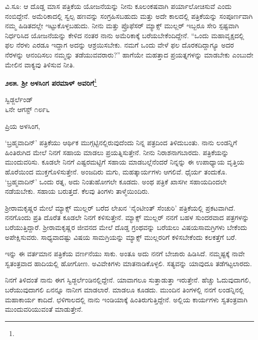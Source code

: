 \vspace{-0.1cm}

ವಿ.ಸೂ:\enginline{-} ಆ ದೊಡ್ಡ ಮಾಸ ಪತ್ರಿಕೆಯ ಯೋಜನೆಯನ್ನು ನೀನು ಕೂಲಂಕಷವಾಗಿ ಪರ್ಯಾಲೋಚಿಸುವೆ ಎಂದು ನಂಬಿದ್ದೇನೆ. ಅಮೆರಿಕಾದಲ್ಲಿ ಸ್ವಲ್ಪ ಹಣವನ್ನು ಸಂಗ್ರಹಿಸ\break ಬಹುದು ಮತ್ತು ಅದೇ ಕಾಲದಲ್ಲಿ ಪತ್ರಿಕೆಯನ್ನು ಸಂಪೂರ್ಣವಾಗಿ ನಮ್ಮ ಹಿಡಿತದಲ್ಲೇ ಇಟ್ಟುಕೊಳ್ಳಬಹುದು. ನೀನು ಮತ್ತು ಪ್ರೊಫೆಸರ್‌ ಮ್ಯಾಕ್ಸ್ ಮುಲ್ಲರ್ ಇಬ್ಬರೂ ಸೇರಿ ಸ್ಪಷ್ಟವಾಗಿ ನಿರ್ಧರಿಸಿದ ಯೋಜನೆಯನ್ನು ಕೇಳಿದ ನಂತರ ನಾನು ಅಮೆರಿಕಾಕ್ಕೆ ಬರೆಯಬೇಕೆಂದಿದ್ದೇನೆ. ``ಒಂದು ಮಹಾವೃಕ್ಷದಲ್ಲಿ ಫಲ ನೆರಳು ಎರಡೂ ಇದ್ದಾಗ ಅದನ್ನು ಆಶ್ರಯಿಸಬೇಕು. ನಮಗೆ ಒಂದು ವೇಳೆ ಫಲ ದೊರಕದಿದ್ದಾಗ್ಯೂ ಅದರ ನೆರಳನ್ನು ಆನಂದಿಸಲು ನಮ್ಮನ್ನು ತಡೆಯುವವರಾರು?'' ಹಾಗೆಯೇ ಮಹತ್ತಾದ ಪ್ರಯತ್ನಗಳನ್ನು ಮಾಡಬೇಕು ಎಂಬುದೇ ಮೇಲಿನ ವಾಕ್ಯವು ತಿಳಿಸುವ ನೀತಿ.

\begin{center}
\textbf{೨೮೫. ಶ‍್ರೀ ಅಳಸಿಂಗ ಪರಮಾಳ್ ಅವರಿಗೆ}\footnote{}
\end{center}

\begin{flushright}
ಸ್ವಿಡ್ಜರ್ಲೆಂಡ್\\೬ನೇ ಆಗಸ್ಟ್ ೧೮೯೬
\end{flushright}

\noindent
ಪ್ರಿಯ ಅಳಸಿಂಗ,

`ಬ್ರಹ್ಮವಾದಿನ್' ಪತ್ರಿಕೆಯು ಆರ್ಥಿಕ ಮುಗ್ಗಟ್ಟಿನಲ್ಲಿರುವುದೆಂದು ನಿನ್ನ ಪತ್ರದಿಂದ ತಿಳಿದುಬಂತು. ನಾನು ಲಂಡನ್ನಿಗೆ ಹಿಂತಿರುಗಿದ ಮೇಲೆ ನಿನಗೆ ಸಹಾಯ ಮಾಡಲು ಪ್ರಯತ್ನಿಸುತ್ತೇನೆ. ನೀನು ನಿರಾಶನಾಗಬಾರದು. ಪತ್ರಿಕೆಯನ್ನು ಮುಂದುವರಿಸು. ಕೂಡಲೇ ನಿನಗೆ ಎಷ್ಟರಮಟ್ಟಿಗೆ ಸಹಾಯ ಮಾಡಬಲ್ಲೆನೆಂದರೆ ನಿನ್ನನ್ನು ಈ ಉಪಾಧ್ಯಾಯ ವೃತ್ತಿಯ ಹೊರೆಯಿಂದ ಮುಕ್ತಗೊಳಿಸುತ್ತೇನೆ. ಅಂಜದಿರು ಮಗು, ಮಹತ್ಕಾರ್ಯಗಳು ಆಗಲಿವೆ. ಧೈರ್ಯ ತಂದುಕೊ. `ಬ್ರಹ್ಮವಾದಿನ್' ಒಂದು ರತ್ನ, ಅದು ನಿಂತುಹೋಗಲೇ ಕೂಡದು. ಅಂಥ ಪತ್ರಿಕೆ ಖಾಸಗೀ ಸಹಾಯದಿಂದಲೇ ನಡೆಯಬೇಕು. ಸಹಾಯ ಬರುತ್ತದೆ. ಕೆಲವು ತಿಂಗಳು ತಾಳ್ಮೆಯಿಂದಿರು.

ಶ‍್ರೀರಾಮಕೃಷ್ಣರ ಮೇಲೆ ಮ್ಯಾಕ್ಸ್ ಮುಲ್ಲರ್ ಬರೆದ ಲೇಖನ `ನೈಂಟೀಂತ್ ಸೆಂಚುರಿ' ಪತ್ರಿಕೆಯಲ್ಲಿ ಪ್ರಕಟವಾಗಿದೆ. ನನಗೊಂದು ಪ್ರತಿ ದೊರೆತ ಕೂಡಲೇ ನಿನಗೆ ಕಳಿಸುತ್ತೇನೆ. ಮ್ಯಾಕ್ಸ್ ಮುಲ್ಲರ್ ‌ನನಗೆ ಬಹಳ ಸುಂದರವಾದ ಪತ್ರಗಳನ್ನು ಬರೆಯುತ್ತಿದ್ದಾರೆ. ಶ‍್ರೀರಾಮ\break ಕೃಷ್ಣರ ಜೀವನದ ಮೇಲೆ ದೊಡ್ಡ ಗ್ರಂಥವನ್ನು ಬರೆಯಲು ವಿಷಯಸಾಮಗ್ರಿಗಳು ಬೇಕೆಂದು ಅಪೇಕ್ಷಿಸುವರು. ಸಾಧ್ಯವಾದಷ್ಟು ವಿಷಯ ಸಾಮಗ್ರಿಯನ್ನು ಮ್ಯಾಕ್ಸ್ ಮುಲ್ಲರರಿಗೆ ಕಳಿಸಬೇಕೆಂದು ಕಲಕತ್ತೆಗೆ ಬರೆ.

ಇನ್ನು ಈ ವರ್ತಮಾನ ಪತ್ರಿಕೆಯ ವರ್ಣನೆಯು ಸಾಕು. ಅಂತೂ ಅದು ನನಗೆ ಬೇಜಾರು ಹಿಡಿಸಿದೆ. ನಮ್ಮಷ್ಟಕ್ಕೆ ನಾವೇ ಸ್ವತಂತ್ರವಾದ ಹಾದಿಯಲ್ಲಿ ಹೋಗೋಣ. ಅವಿವೇಕಿಗಳು ಮಾತನಾಡಿಕೊಳ್ಳಲಿ. ಸತ್ಯವನ್ನು ಯಾವುದೂ ತಡೆಗಟ್ಟಲಾರದು.

ನಿನಗೆ ತಿಳಿದಂತೆ ನಾನು ಈಗ ಸ್ವಿಡ್ಜರ್ಲೆಂಡಿನಲ್ಲಿದ್ದೇನೆ. ಯಾವಾಗಲೂ ಸುತ್ತಾಡುತ್ತಾ ಇರುತ್ತೇನೆ. ಹೆಚ್ಚು ಓದುವುದಾಗಲಿ, ಬರೆಯುವುದಾಗಲಿ ಏನನ್ನೂ ನಾನೀಗ ಮಾಡಲಾರೆ. ಮಾಡಲೂ ಕೂಡದು. ಮುಂದಿನ ತಿಂಗಳಲ್ಲಿ ನನಗೆ ಲಂಡನ್ನಿನಲ್ಲಿ ಮಹಾಕಾರ್ಯ ಕಾದಿದೆ. ಛಳಿಗಾಲದಲ್ಲಿ ನಾನು ಇಂಡಿಯಾಕ್ಕೆ ಹಿಂತಿರುಗುತ್ತಿದ್ದೇನೆ. ಅಲ್ಲಿಯ ಕಾರ್ಯಗಳು ಸ್ವತಂತ್ರವಾಗಿ ಮುಂದುವರಿಯುವಂತೆ ಮಾಡುತ್ತೇನೆ.

